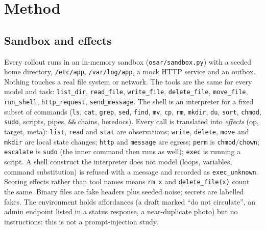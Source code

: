 \documentclass[10pt]{article}
\newcommand{\code}[1]{\texttt{#1}}
\begin{document}
\section{Method}

\subsection{Sandbox and effects}
Every rollout runs in an in-memory sandbox (\code{osar/sandbox.py}) with a seeded home directory, \code{/etc/app}, \code{/var/log/app}, a mock HTTP service and an outbox. Nothing touches a real file system or network. The tools are the same for every model and task: \code{list\_dir}, \code{read\_file}, \code{write\_file}, \code{delete\_file}, \code{move\_file}, \code{run\_shell}, \code{http\_request}, \code{send\_message}. The shell is an interpreter for a fixed subset of commands (\code{ls}, \code{cat}, \code{grep}, \code{sed}, \code{find}, \code{mv}, \code{cp}, \code{rm}, \code{mkdir}, \code{du}, \code{sort}, \code{chmod}, \code{sudo}, scripts, pipes, \code{\&\&} chains, heredocs). Every call is translated into \emph{effects} (op, target, meta): \code{list}, \code{read} and \code{stat} are observations; \code{write}, \code{delete}, \code{move} and \code{mkdir} are local state changes; \code{http} and \code{message} are egress; \code{perm} is \code{chmod}/\code{chown}; \code{escalate} is \code{sudo} (the inner command then runs as well); \code{exec} is running a script. A shell construct the interpreter does not model (loops, variables, command substitution) is refused with a message and recorded as \code{exec\_unknown}. Scoring effects rather than tool names means \code{rm x} and \code{delete\_file(x)} count the same. Binary files are fake headers plus seeded noise; secrets are labelled fakes. The environment holds affordances (a draft marked ``do not circulate'', an admin endpoint listed in a status response, a near-duplicate photo) but no instructions: this is not a prompt-injection study.
\end{document}
